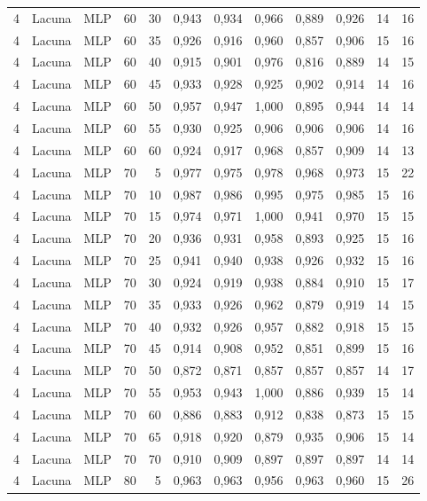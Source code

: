 \begin{longtable}{ccclrrrrrrrr}
4 & Lacuna & MLP & 60 & 30 & 0,943 & 0,934 & 0,966 & 0,889 & 0,926 & 14 & 16 \\
4 & Lacuna & MLP & 60 & 35 & 0,926 & 0,916 & 0,960 & 0,857 & 0,906 & 15 & 16 \\
4 & Lacuna & MLP & 60 & 40 & 0,915 & 0,901 & 0,976 & 0,816 & 0,889 & 14 & 15 \\
4 & Lacuna & MLP & 60 & 45 & 0,933 & 0,928 & 0,925 & 0,902 & 0,914 & 14 & 16 \\
4 & Lacuna & MLP & 60 & 50 & 0,957 & 0,947 & 1,000 & 0,895 & 0,944 & 14 & 14 \\
4 & Lacuna & MLP & 60 & 55 & 0,930 & 0,925 & 0,906 & 0,906 & 0,906 & 14 & 16 \\
4 & Lacuna & MLP & 60 & 60 & 0,924 & 0,917 & 0,968 & 0,857 & 0,909 & 14 & 13 \\
4 & Lacuna & MLP & 70 & 5 & 0,977 & 0,975 & 0,978 & 0,968 & 0,973 & 15 & 22 \\
4 & Lacuna & MLP & 70 & 10 & 0,987 & 0,986 & 0,995 & 0,975 & 0,985 & 15 & 16 \\
4 & Lacuna & MLP & 70 & 15 & 0,974 & 0,971 & 1,000 & 0,941 & 0,970 & 15 & 15 \\
4 & Lacuna & MLP & 70 & 20 & 0,936 & 0,931 & 0,958 & 0,893 & 0,925 & 15 & 16 \\
4 & Lacuna & MLP & 70 & 25 & 0,941 & 0,940 & 0,938 & 0,926 & 0,932 & 15 & 16 \\
4 & Lacuna & MLP & 70 & 30 & 0,924 & 0,919 & 0,938 & 0,884 & 0,910 & 15 & 17 \\
4 & Lacuna & MLP & 70 & 35 & 0,933 & 0,926 & 0,962 & 0,879 & 0,919 & 14 & 15 \\
4 & Lacuna & MLP & 70 & 40 & 0,932 & 0,926 & 0,957 & 0,882 & 0,918 & 15 & 15 \\
4 & Lacuna & MLP & 70 & 45 & 0,914 & 0,908 & 0,952 & 0,851 & 0,899 & 15 & 16 \\
4 & Lacuna & MLP & 70 & 50 & 0,872 & 0,871 & 0,857 & 0,857 & 0,857 & 14 & 17 \\
4 & Lacuna & MLP & 70 & 55 & 0,953 & 0,943 & 1,000 & 0,886 & 0,939 & 15 & 14 \\
4 & Lacuna & MLP & 70 & 60 & 0,886 & 0,883 & 0,912 & 0,838 & 0,873 & 15 & 15 \\
4 & Lacuna & MLP & 70 & 65 & 0,918 & 0,920 & 0,879 & 0,935 & 0,906 & 15 & 14 \\
4 & Lacuna & MLP & 70 & 70 & 0,910 & 0,909 & 0,897 & 0,897 & 0,897 & 14 & 14 \\
4 & Lacuna & MLP & 80 & 5 & 0,963 & 0,963 & 0,956 & 0,963 & 0,960 & 15 & 26 \\

\end{longtable}
